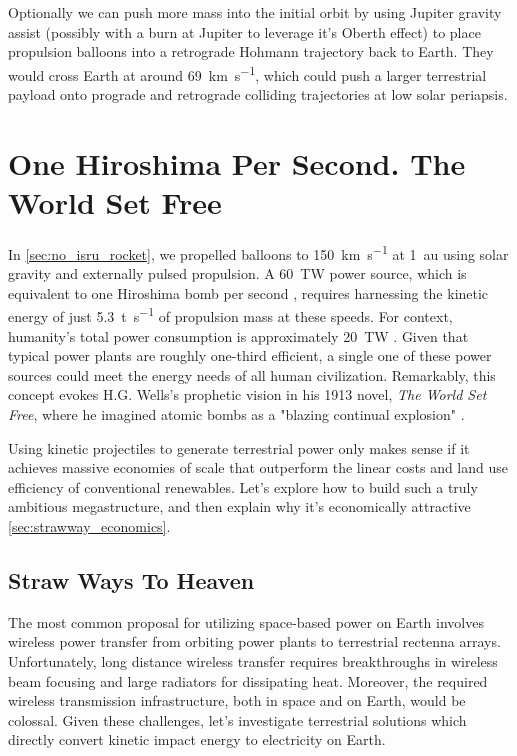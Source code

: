 \documentclass{article}
\begin{document}
{Optionally we can push more mass into the initial orbit by using Jupiter gravity assist (possibly with a burn at Jupiter to leverage it's Oberth effect) to place propulsion balloons into a retrograde Hohmann trajectory back to Earth.   They would cross Earth at around \SI{69}{\kilo\meter\per\second}, which could push a larger terrestrial payload onto  prograde and retrograde colliding trajectories at low solar periapsis.

\section{One Hiroshima Per Second. The World Set Free}\label{sec:world_set_free}
In \autoref{sec:no_isru_rocket}, we propelled balloons to \SI{150}{\kilo\meter\per\second} at \SI{1}{\astronomicalunit} using solar gravity and externally pulsed propulsion. A \SI{60}{\tera\watt} power source, which is equivalent to one Hiroshima bomb per second \cite{hiroshima}, requires harnessing the kinetic energy of just \SI{5.3}{\tonne\per\second} of propulsion mass at these speeds. For context, humanity's total power consumption is approximately \SI{20}{\tera\watt} \cite{owid-energy-production-consumption}. Given that typical power plants are roughly one-third efficient, a single one of these power sources could meet the energy needs of all human civilization.  Remarkably, this concept evokes H.G. Wells's prophetic vision in his 1913 novel, \textit{The World Set Free}, where he imagined atomic bombs as a "blazing continual explosion" \cite{wells1914world}.  

Using kinetic projectiles to generate terrestrial power only makes sense if it achieves massive economies of scale that outperform the linear costs and land use efficiency of conventional renewables.  Let's explore how to build such a truly ambitious megastructure, and then explain why it's economically attractive \autoref{sec:strawway_economics}.     

\subsection{Straw Ways To Heaven}\label{sec:straw_way_to_heaven}
The most common proposal for utilizing space-based power on Earth involves wireless power transfer from orbiting power plants to terrestrial rectenna arrays.  Unfortunately, long distance wireless transfer requires breakthroughs in wireless beam focusing \cite{space_beaming_power} and large radiators for dissipating heat. Moreover, the required wireless transmission infrastructure, both in space and on Earth, would be colossal.  Given these challenges, let's investigate terrestrial solutions which directly convert kinetic impact energy to electricity on Earth.

}
\end{document}
